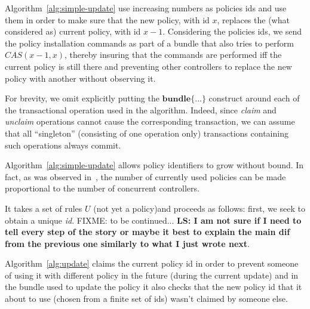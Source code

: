 \documentclass[conference]{sigcomm-alternate}
\newcommand{\hide}[1]{}
\begin{document}
Algorithm~\ref{alg:simple-update} use increasing numbers as policies
ids and use them in order to make sure that the new policy, with id
$x$, replaces the (what considered as) current policy, with id
$x-1$. Considering the policies ids, we send the policy installation
commands as part of a bundle that also tries to perform
$CAS(x-1,x)$, thereby insuring that the commands are
performed iff the current policy is still there and preventing other
controllers to replace the new policy with another without observing it.

For brevity, we omit explicitly putting the $\textbf{bundle}\{...\}$ construct
around each of the transactional operation used in the algorithm.
Indeed, since \textit{claim} and \textit{unclaim} operations cannot
cause the corresponding transaction, we can assume that all
``singleton'' (consisting of one operation only)  transactions
containing such operations always commit.

Algorithm~\ref{alg:simple-update} allows policy identifiers to grow
without bound. In fact, as was observed in~\cite{cpc}, the number of currently
used policies can be made proportional to the number of concurrent
controllers.


 It takes a set of rules $U$ (not yet a policy)and proceeds as follows: first, we seek to
 obtain a unique \emph{id}. FIXME: to be continued...
 \textbf{LS: I am not sure if I need to tell every step of the story or maybe it best to explain the main dif from the previous one similarly to what I just wrote next}.

Algorithm~\ref{alg:update} claims the current policy id in order to prevent someone of using it with different policy in the future (during the current update) and in the bundle used to update the policy it also checks that the new policy id that it about to use (chosen from a finite set of ids) wasn't claimed by someone else.

\hide{
We compute our new suggested policy by applying the update requests on top of current policy, supporting any kind of requests and policies. Then we make a transaction (using the bundle feature) to atomically check that our policy id is not blocked by anyone else, to change the current policy id to ours (an action that would fail if the current policy id is no longer what we are counting of) and to actually configure our new policy.

If one of the actions in the transaction fails we try again. There is no progress guaranty for each controller but there is one for the whole system - at least one of the controller will succeed in fulfilling its update requirements.
}
\end{document}
